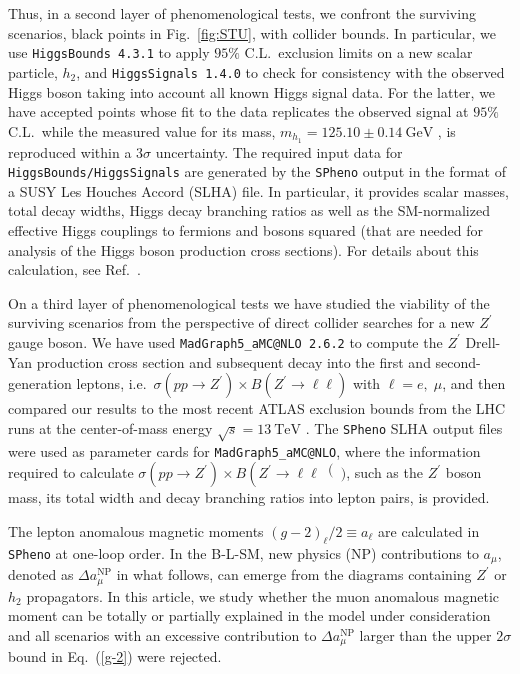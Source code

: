 Thus, in a second layer of phenomenological tests, we confront the surviving scenarios, black points in Fig.~\ref{fig:STU}, with collider bounds. In particular, we use \texttt{HiggsBounds 4.3.1} \cite{Bechtle:2013wla} to apply $95\%$ C.L.~exclusion limits on a new scalar particle, $h_2$, and \texttt{HiggsSignals 1.4.0} \cite{Bechtle:2013xfa} to check for consistency with the observed Higgs boson taking into account all known Higgs signal data. For the latter, we have accepted points whose fit to the data replicates the observed signal at $95\%$ C.L.~while the measured value for its mass, $m_{h_1} = 125.10 \pm 0.14~\textrm{GeV}$ \cite{Tanabashi:2018oca}, is reproduced within a $3\sigma$ uncertainty. The required input data for \texttt{HiggsBounds/HiggsSignals} are generated by the \texttt{SPheno} output in the format of a SUSY Les Houches Accord (SLHA) \cite{Skands:2003cj} file. In particular, it provides scalar masses, total decay widths, Higgs decay branching ratios as well as the SM-normalized effective Higgs couplings to fermions and bosons squared (that are needed for analysis of the Higgs boson production cross sections). For details about this calculation, see Ref.~\cite{Bechtle:2013wla}.
 
On a third layer of phenomenological tests we have studied the viability of the surviving scenarios from the perspective of direct collider searches for a new $Z^\prime$ gauge boson. We have used \texttt{MadGraph5\_aMC@NLO 2.6.2} \cite{Alwall:2014hca} to compute the $Z^\prime$ Drell-Yan production cross section and subsequent decay into the first and second-generation leptons, i.e.~$ \sigma \left( pp \to Z^\prime \right) \times B \left( Z^\prime \to \ell \ell\right)$ with $\ell = e,\; \mu$, and then compared our results to the most recent ATLAS exclusion bounds from the LHC runs at the center-of-mass energy $\sqrt{s} = 13~\textrm{TeV}$ \cite{Aaboud:2017buh}. The \texttt{SPheno} SLHA output files were used as parameter cards for \texttt{MadGraph5\_aMC@NLO}, where the information required to calculate $ \sigma\left(pp \to Z^\prime\right) \times B\left(Z^\prime \to \ell \ell\right()$, such as the $Z^\prime$ boson mass, its total width and decay branching ratios into lepton pairs, is provided. 


The lepton anomalous magnetic moments $\left( g-2 \right)_\ell /2 \equiv a_\ell$ are calculated in \texttt{SPheno} at one-loop order. In the B-L-SM, new physics (NP) contributions to $a_\mu$, denoted as $\Delta a_\mu^{\textrm{NP}}$ in what follows, can emerge from the diagrams containing $Z^\prime$ or $h_2$ propagators. In this article, we study whether the muon anomalous magnetic moment can be totally or partially explained in the model under consideration and all scenarios with an excessive contribution to $\Delta a_\mu^{\textrm{NP}}$ larger than the upper $2 \sigma$ bound in Eq.~(\ref{g-2}) were rejected.


